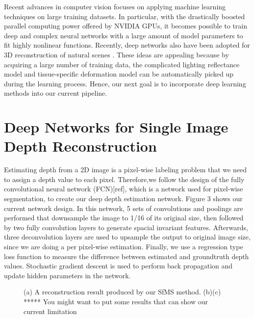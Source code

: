 \documentclass{llncs}
\begin{document}
Recent advances in computer vision focuses on applying machine learning techniques on large training datasets. In particular, with the drastically boosted parallel computing power offered by NVIDIA GPUs, it becomes possible to train deep and complex neural networks with a large amount of model parameters to fit highly nonlinear functions. Recently, deep networks also have been adopted for 3D reconstruction of natural scenes \cite{liu2015,rematas2016}. These ideas are appealing because by acquiring a large number of training data, the complicated lighting reflectance model and tissue-specific deformation model can be automatically picked up during the learning process. Hence, our next goal is to incorporate deep learning methods into our current pipeline.

\section{Deep Networks for Single Image Depth Reconstruction}

Estimating depth from a 2D image is a pixel-wise labeling problem that we need to assign a depth value to each pixel. Therefore,we follow the design of the fully convolutional neural network (FCN)[ref], which is a network used for pixel-wise segmentation, to create our deep depth estimation network. Figure 3 shows our current network design. In this network, 5 sets of convolutions and poolings are performed that downsample the image to 1/16 of its original size, then followed by two fully convolution layers to generate spacial invariant features. Afterwards, three deconvolution layers are used to upsample the output to original image size, since we are doing a per pixel-wise estimation. Finally, we use a regression type loss function to measure the difference between estimated and groundtruth depth values. Stochastic gradient descent is used to perform back propagation and update hidden parameters in the network. 

\begin{figure}[!b]
  \centering
  \caption{(a) A reconstruction result produced by our SfMS method. (b)(c) ***** You might want to put some results that can show our current limitation}
  \label{fig:sfms_result}
\end{figure}
\end{document}
